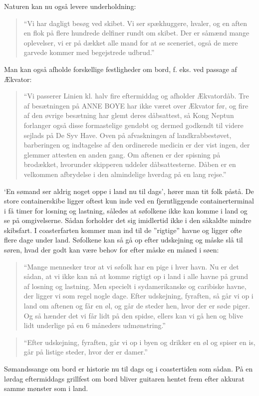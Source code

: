 Naturen kan nu også levere underholdning: 

\begin{quote}
    ``Vi har dagligt besøg ved skibet. Vi ser spækhuggere, hvaler, og en
    aften en flok på flere hundrede delfiner rundt om skibet.  Der er
    såmænd mange oplevelser, vi er på dækket alle mand for at se
    sceneriet, også de mere garvede kommer med begejstrede udbrud.''
\end{quote}

Man kan også afholde forskellige festligheder om bord, f. eks. ved passage
af Ækvator: 

\begin{quote}
    ``Vi passerer Linien kl. halv fire eftermiddag og afholder Ækvatordåb.
    Tre af besætningen på ANNE BOYE har ikke været over Ækvator før, og
    fire af den øvrige besætning har glemt deres dåbsattest, så Kong
    Neptun forlanger også disse formastelige gendøbt og dermed godkendt
    til videre sejlads på De Syv Have. Oven på afvaskningen af
    landkrabbestøvet, barberingen og indtagelse af den ordinerede medicin
    er der vist ingen, der glemmer attesten en anden gang. Om aftenen er
    der spisning på brodækket, hvorunder skipperen uddeler dåbsattesterne.
    Dåben er en velkommen afbrydelse i den almindelige hverdag på en lang
    rejse.''
\end{quote}

`En sømand ser aldrig noget oppe i land nu til dags', hører man tit folk
påstå. De store containerskibe ligger oftest kun inde ved en
fjerntliggende containerterminal i få timer for losning og lastning,
således at søfolkene ikke kan komme i land og se på omgivelserne. Sådan
forholder det sig imidlertid ikke i den såkaldte mindre skibsfart. I
coasterfarten kommer man ind til de ''rigtige'' havne og ligger ofte flere
dage under land. Søfolkene kan så gå op efter udskejning og måske slå til
søren, hvad der godt kan være behov for efter måske en måned i søen: 

\begin{quote}
    ``Mange mennesker tror at vi søfolk har en pige i hver
    havn. Nu er det sådan, at vi ikke kan nå at komme rigtigt op i land i
    alle havne på grund af losning og lastning. Men specielt i
    sydamerikanske og caribiske havne, der ligger vi som regel nogle dage.
    Efter udskejning, fyraften, så går vi op i land om aftenen og får en øl,
    og går de steder hen, hvor der er søde piger. Og så hænder det vi får
    lidt på den spidse, ellers kan vi gå hen og blive lidt underlige på en 6
    måneders udmønstring.''
\end{quote}

\begin{quote}
    ``Efter udskejning, fyraften, går vi op i byen og drikker en øl og spiser
    en is, går på listige steder, hvor der er damer.''
\end{quote}

Sømandssange om bord er historie nu til dags og i coastertiden
som sådan. På en lørdag eftermiddags grillfest om bord bliver guitaren
hentet frem efter akkurat samme mønster som i land.
